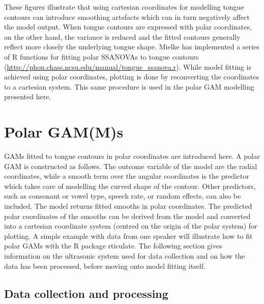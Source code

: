 \documentclass[12pt,]{article}
\begin{document}
These figures illustrate that using cartesian coordinates for modelling
tongue contours can introduce smoothing artefacts which can in turn
negatively affect the model output. When tongue contours are expressed
with polar coordinates, on the other hand, the variance is reduced and
the fitted contours generally reflect more closely the underlying tongue
shape. Mielke has implemented a series of R \citep{r-core-team2018}
functions for fitting polar SSANOVAs to tongue contours
(\url{http://phon.chass.ncsu.edu/manual/tongue_ssanova.r}). While model
fitting is achieved using polar coordinates, plotting is done by
reconverting the coordinates to a cartesian system. This same procedure
is used in the polar GAM modelling presented here.

\hypertarget{polar-gamms}{%
\section{Polar GAM(M)s}\label{polar-gamms}}

GAMs fitted to tongue contours in polar coordinates are introduced here.
A polar GAM is constructed as follows. The outcome variable of the model
are the radial coordinates, while a smooth term over the angular
coordinates is the predictor which takes care of modelling the curved
shape of the contour. Other predictors, such as consonant or vowel type,
speech rate, or random effects, can also be included. The model returns
fitted smooths in polar coordinates. The predicted polar coordinates of
the smooths can be derived from the model and converted into a cartesian
coordinate system (centred on the origin of the polar system) for
plotting. A simple example with data from one speaker will illustrate
how to fit polar GAMs with the R package rticulate. The following
section gives information on the ultrasonic system used for data
collection and on how the data has been processed, before moving onto
model fitting itself.

\hypertarget{data-collection-and-processing}{%
\subsection{Data collection and
processing}\label{data-collection-and-processing}}

\label{s:data}
\end{document}
